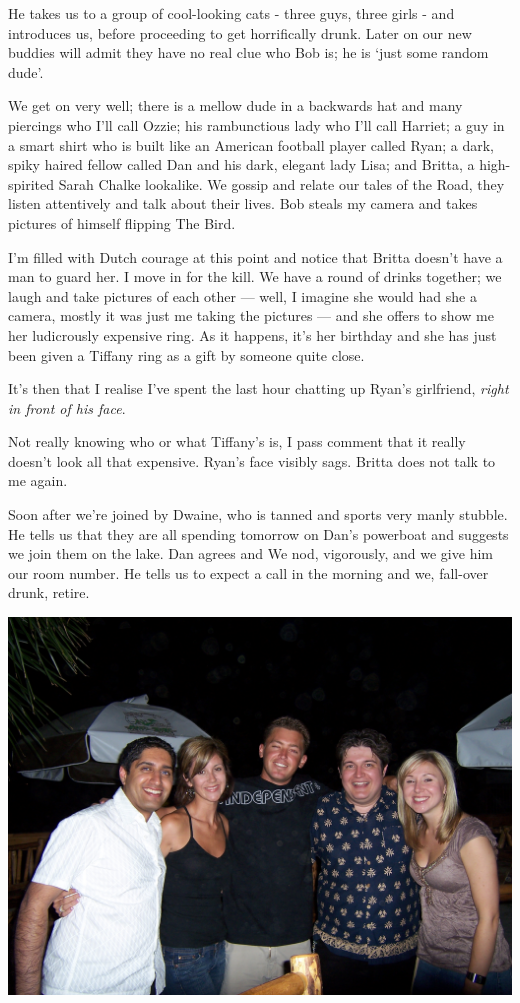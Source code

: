 \documentclass[a5paper,titlepage,11pt,draft]{book}
\begin{document}
He takes us to a group of cool-looking cats - three guys, three girls - and introduces us, before proceeding to get horrifically drunk.  Later on our new buddies will admit they have no real clue who Bob is; he is `just some random dude'.

We get on very well; there is a mellow dude in a backwards hat and many piercings who I'll call Ozzie; his rambunctious lady who I'll call Harriet; a guy in a smart shirt who is built like an American football player called Ryan; a dark, spiky haired fellow called Dan and his dark, elegant lady Lisa; and Britta, a high-spirited Sarah Chalke lookalike.  We gossip and relate our tales of the Road, they listen attentively and talk about their lives.  Bob steals my camera and takes pictures of himself flipping The Bird.

I'm filled with Dutch courage at this point and notice that Britta doesn't have a man to guard her.  I move in for the kill.  We have a round of drinks together; we laugh and take pictures of each other --- well, I imagine she would had she a camera, mostly it was just me taking the pictures --- and she offers to show me her ludicrously expensive ring.  As it happens, it's her birthday and she has just been given a Tiffany ring as a gift by someone quite close.

It's then that I realise I've spent the last hour chatting up Ryan's girlfriend, \emph{right in front of his face}.

Not really knowing who or what Tiffany's is, I pass comment that it really doesn't look all that expensive.  Ryan's face visibly sags.  Britta does not talk to me again.

Soon after we're joined by Dwaine, who is tanned and sports very manly stubble.  He tells us that they are all spending tomorrow on Dan's powerboat and suggests we join them on the lake.  Dan agrees and We nod, vigorously, and we give him our room number.  He tells us to expect a call in the morning and we, fall-over drunk, retire.

\begin{center}\includegraphics[width=\textwidth]{gfx/100_1579}\end{center}
\end{document}
